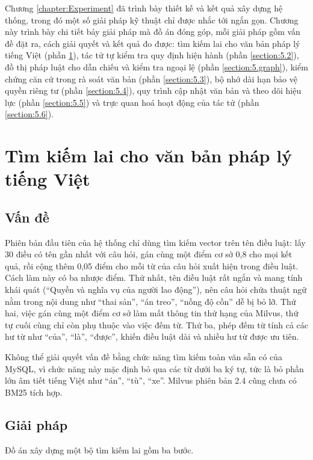 \documentclass[../DoAn.tex]{subfiles}
\begin{document}
Chương \ref{chapter:Experiment} đã trình bày thiết kế và kết quả xây dựng hệ thống, trong đó một số giải pháp kỹ thuật chỉ được nhắc tới ngắn gọn. Chương này trình bày chi tiết bảy giải pháp mà đồ án đóng góp, mỗi giải pháp gồm vấn đề đặt ra, cách giải quyết và kết quả đo được: tìm kiếm lai cho văn bản pháp lý tiếng Việt (phần \ref{section:5.1}), tác tử tự kiểm tra quy định hiện hành (phần \ref{section:5.2}), đồ thị pháp luật cho dẫn chiếu và kiểm tra ngoại lệ (phần \ref{section:5.graph}), kiểm chứng căn cứ trong rà soát văn bản (phần \ref{section:5.3}), bộ nhớ dài hạn bảo vệ quyền riêng tư (phần \ref{section:5.4}), quy trình cập nhật văn bản và theo dõi hiệu lực (phần \ref{section:5.5}) và trực quan hoá hoạt động của tác tử (phần \ref{section:5.6}).

\section{Tìm kiếm lai cho văn bản pháp lý tiếng Việt}
\label{section:5.1}

\subsection{Vấn đề}
Phiên bản đầu tiên của hệ thống chỉ dùng tìm kiếm vector trên tên điều luật: lấy 30 điều có tên gần nhất với câu hỏi, gán cùng một điểm cơ sở 0,8 cho mọi kết quả, rồi cộng thêm 0,05 điểm cho mỗi từ của câu hỏi xuất hiện trong điều luật. Cách làm này có ba nhược điểm. Thứ nhất, tên điều luật rất ngắn và mang tính khái quát (``Quyền và nghĩa vụ của người lao động''), nên câu hỏi chứa thuật ngữ nằm trong nội dung như ``thai sản'', ``án treo'', ``nồng độ cồn'' dễ bị bỏ lỡ. Thứ hai, việc gán cùng một điểm cơ sở làm mất thông tin thứ hạng của Milvus, thứ tự cuối cùng chỉ còn phụ thuộc vào việc đếm từ. Thứ ba, phép đếm từ tính cả các hư từ như ``của'', ``là'', ``được'', khiến điều luật dài và nhiều hư từ được ưu tiên.

Không thể giải quyết vấn đề bằng chức năng tìm kiếm toàn văn sẵn có của MySQL, vì chức năng này mặc định bỏ qua các từ dưới ba ký tự, tức là bỏ phần lớn âm tiết tiếng Việt như ``án'', ``tù'', ``xe''. Milvus phiên bản 2.4 cũng chưa có BM25 tích hợp.

\subsection{Giải pháp}
Đồ án xây dựng một bộ tìm kiếm lai gồm ba bước.
\end{document}
